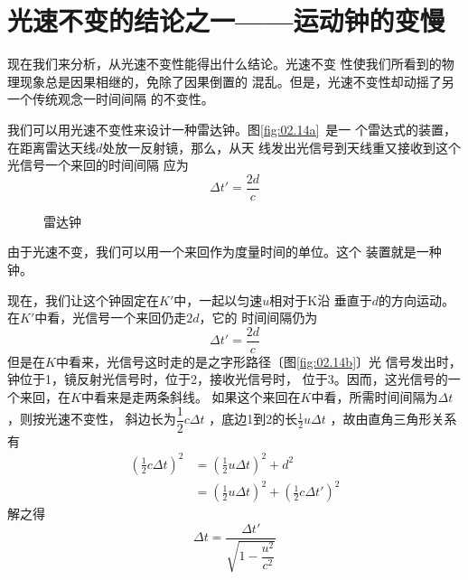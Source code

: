 \documentclass[../outline-of-mechanics.tex]{subfiles}
\begin{document}
\section{光速不变的结论之一——运动钟的变慢}\label{sec:02.07}

现在我们来分析，从光速不变性能得出什么结论。光速不变
性使我们所看到的物理现象总是因果相继的，免除了因果倒置的
混乱。但是，光速不变性却动摇了另一个传统观念一时间间隔
的不变性。

我们可以用光速不变性来设计一种雷达钟。图\ref{fig:02.14a}~是一
个雷达式的装置，在距离雷达天线$d$处放一反射镜，那么，从天
线发出光信号到天线重又接收到这个光信号一个来回的时间间隔
应为
\begin{equation*}
  \Delta t ' = \frac { 2 d } { c }
\end{equation*}
\begin{figure}[!h]
  \centering
  \quad
  \caption{雷达钟}
  \label{fig:02.14}
\end{figure}

由于光速不变，我们可以用一个来回作为度量时间的单位。这个
装置就是一种钟。

现在，我们让这个钟固定在$K'$中，一起以匀速$u$相对于K沿
垂直于$d$的方向运动。在$K'$中看，光信号一个来回仍走$2d$，它的
时间间隔仍为
\begin{equation*}
  \Delta t ' = \frac { 2 d } { c }
\end{equation*}
但是在$K$中看来，光信号这时走的是之字形路径〔图\ref{fig:02.14b}〕光
信号发出时，钟位于1，镜反射光信号时，位于2，接收光信号时，
位于3。因而，这光信号的一个来回，在$K$中看来是走两条斜线。
如果这个来回在$K$中看，所需时间间隔为$\Delta t$，则按光速不变性，
斜边长为$\dfrac { 1 } { 2 } c \Delta t $ ，底边1到2的长$\frac { 1 } { 2 } u \Delta t$ ，故由直角三角形关系
有
\begin{align*}
  \left( \frac { 1 } { 2 } c \Delta t \right) ^ { 2 } & = \left( \frac { 1 } { 2 } u \Delta t \right) ^ { 2 } + d ^ { 2 }                                             \\
                                                      & = \left( \frac { 1 } { 2 } u \Delta t \right) ^ { 2 } + \left( \frac { 1 } { 2 } c \Delta t ' \right) ^ { 2 }
\end{align*}
解之得
\begin{equation}\label{eqn:02.07.01}
  \Delta t = \frac { \Delta t ' } { \sqrt { 1 - \dfrac { u ^ 2 } { c ^ { 2 } } } }
\end{equation}
\end{document}
